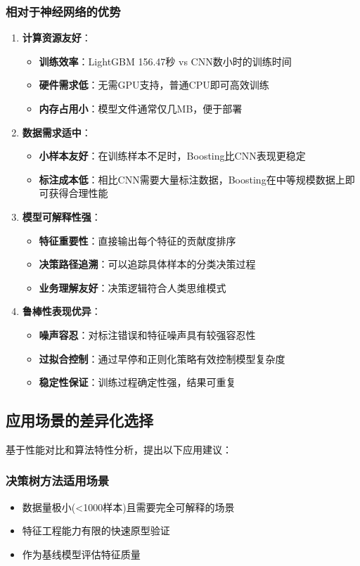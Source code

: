 \documentclass[UTF8]{report}
\theoremstyle{MyLineTheoremStyle} %
\theoremstyle{MyBlockTheoremStyle} %
\theoremstyle{MySubsubsectionStyle} %
\begin{document}
\subsubsection{相对于神经网络的优势}
\begin{enumerate}
    \item \textbf{计算资源友好}：
    \begin{itemize}
        \item \textbf{训练效率}：LightGBM 156.47秒 vs CNN数小时的训练时间
        \item \textbf{硬件需求低}：无需GPU支持，普通CPU即可高效训练
        \item \textbf{内存占用小}：模型文件通常仅几MB，便于部署
    \end{itemize}
    \item \textbf{数据需求适中}：
    \begin{itemize}
        \item \textbf{小样本友好}：在训练样本不足时，Boosting比CNN表现更稳定
        \item \textbf{标注成本低}：相比CNN需要大量标注数据，Boosting在中等规模数据上即可获得合理性能
    \end{itemize}
    \item \textbf{模型可解释性强}：
    \begin{itemize}
        \item \textbf{特征重要性}：直接输出每个特征的贡献度排序
        \item \textbf{决策路径追溯}：可以追踪具体样本的分类决策过程
        \item \textbf{业务理解友好}：决策逻辑符合人类思维模式
    \end{itemize}
    \item \textbf{鲁棒性表现优异}：
    \begin{itemize}
        \item \textbf{噪声容忍}：对标注错误和特征噪声具有较强容忍性
        \item \textbf{过拟合控制}：通过早停和正则化策略有效控制模型复杂度
        \item \textbf{稳定性保证}：训练过程确定性强，结果可重复
    \end{itemize}
\end{enumerate}

\subsection{应用场景的差异化选择}
基于性能对比和算法特性分析，提出以下应用建议：
\subsubsection{决策树方法适用场景}
\begin{itemize}
    \item 数据量极小(<1000样本)且需要完全可解释的场景
    \item 特征工程能力有限的快速原型验证
    \item 作为基线模型评估特征质量
\end{itemize}
\end{document}
